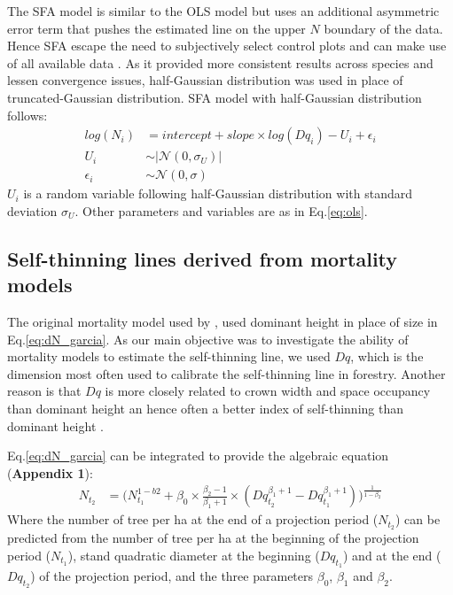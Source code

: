 \documentclass[12pt,english]{article}
\begin{document}
The SFA model is similar to the OLS model but uses an additional asymmetric error term that pushes the estimated line on the upper $N$ boundary of the data. Hence SFA escape the need to subjectively select control plots and can make use of all available data \citep*{ZhangBiGoveEtAl2005}. As it provided more consistent results across species and lessen convergence issues, half-Gaussian distribution \citep*{WeiskittelGouldTemesgen2009} was used in place of truncated-Gaussian distribution. SFA model with half-Gaussian distribution follows:
\begin{align}
\label{eq:sfa}
  log(N_i) &= intercept + slope \times log(Dq_i) - U_i + \epsilon_i \\
  U_i &\sim \lvert \mathcal{N} (0, \sigma_U) \rvert \nonumber\\
  \epsilon_i &\sim \mathcal{N} (0, \sigma) \nonumber
\end{align}
$U_i$ is a random variable following half-Gaussian distribution with standard deviation $\sigma_U$. Other parameters and variables are as in Eq.\ref{eq:ols}. 

\subsection{Self-thinning lines derived from mortality models}
The original mortality model used by \citet{Garcia2009}, used dominant height in place of size in Eq.\ref{eq:dN_garcia}. As our main objective was to investigate the ability of mortality models to estimate the self-thinning line, we used $Dq$, which is the dimension most often used to calibrate the self-thinning line in forestry. Another reason is that $Dq$ is more closely related to crown width and space occupancy than dominant height an hence often a better index of self-thinning than dominant height \citep{Zeide2010}.

Eq.\ref{eq:dN_garcia} can be integrated to provide the algebraic equation (\textbf{Appendix 1}):
\begin{align}
  \label{eq:algebraic}
  N_{t_2} &= \Big( N_{t_1}^{1-b2} + \beta_0 \times \frac{\beta_2-1}{\beta_1+1} \times (Dq_{t_2}^{\beta_1+1} - Dq_{t_1}^{\beta_1+1}) \Big) ^{\frac{1}{1-\beta_2}}   
\end{align}
Where the number of tree per ha at the end of a projection period ($N_{t_2}$) can be predicted from the number of tree per ha at the beginning of the projection period ($N_{t_1}$), stand quadratic diameter at the beginning ($Dq_{t_1}$) and at the end ($Dq_{t_2}$) of the projection period, and the three parameters $\beta_0$, $\beta_1$ and $\beta_2$. 
\end{document}
